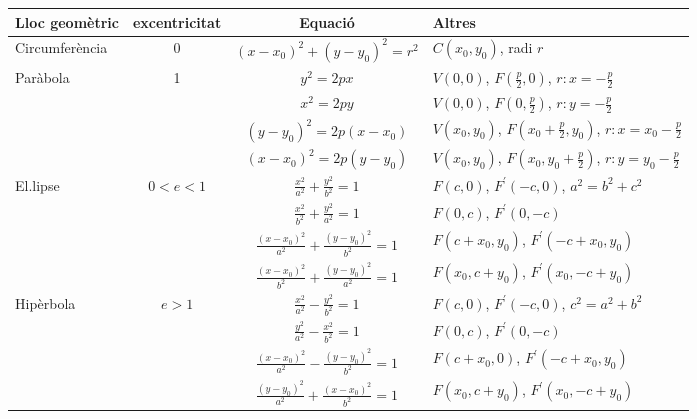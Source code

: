 \documentclass[a4paper,landscape]{article}
\begin{document}
	\author{Mireia Dosil}
	\date{text}


 
 
\begin{center}
	\begin{tabular}{ | l | c | c | l |}
		\hline
		Lloc geomètric & excentricitat & Equació & Altres \\ \hline
		Circumferència & 0 & $(x-x_0)^2+(y-y_0)^2=r^2$ & $C(x_0,y_0)$, radi $r$ \\
		\hline
		\multirow{4}{*}{Paràbola} & \multirow{4}{*}{1} & $y^2=2px$ & $V(0,0)$, $F(\frac{p}{2},0)$, $r:x=-\frac{p}{2}$ \\ \cline{3-4}
		& &  $x^2=2py$ & $V(0,0)$, $F(0,\frac{p}{2})$, $r:y=-\frac{p}{2}$  \\ \cline{3-4}
		& &  $(y-y_0)^2=2p(x-x_0)$ & $V(x_0,y_0)$, $F(x_0+\frac{p}{2},y_0)$, $r:x=x_0-\frac{p}{2}$  \\ \cline{3-4}
		& &  $(x-x_0)^2=2p(y-y_0)$ & $V(x_0,y_0)$, $F(x_0,y_0+\frac{p}{2})$, $r:y=y_0-\frac{p}{2}$  \\ \cline{3-4}
		\hline
		\multirow{4}{*}{El.lipse} & \multirow{4}{*}{$0<e<1$} & $\frac{x^2}{a^2}+\frac{y^2}{b^2}=1$ & $F(c,0)$, $F^\prime(-c,0)$, $a^2=b^2+c^2$  \\ \cline{3-4}
		& & $\frac{x^2}{b^2}+\frac{y^2}{a^2}=1$ & $F(0,c)$, $F^\prime(0,-c)$  \\ \cline{3-4}
		& & $\frac{(x-x_0)^2}{a^2}+\frac{(y-y_0)^2}{b^2}=1$ & $F(c+x_0,y_0)$, $F^\prime(-c+x_0,y_0)$\\ \cline{3-4}
		& & $\frac{(x-x_0)^2}{b^2}+\frac{(y-y_0)^2}{a^2}=1$ & $F(x_0,c+y_0)$, $F^\prime(x_0,-c+y_0)$  \\ \cline{3-4}
		\hline
		\multirow{4}{*}{Hipèrbola} & \multirow{4}{*}{$e>1$} & $\frac{x^2}{a^2}-\frac{y^2}{b^2}=1$ & $F(c,0)$, $F^\prime(-c,0)$, $c^2=a^2+b^2$  \\ \cline{3-4}
		& & $\frac{y^2}{a^2}-\frac{x^2}{b^2}=1$ & $F(0,c)$, $F^\prime(0,-c)$  \\ \cline{3-4}
		& & $\frac{(x-x_0)^2}{a^2}-\frac{(y-y_0)^2}{b^2}=1$ & $F(c+x_0,0)$, $F^\prime(-c+x_0,y_0)$\\ \cline{3-4}
		& & $\frac{(y-y_0)^2}{a^2}+\frac{(x-x_0)^2}{b^2}=1$ & $F(x_0,c+y_0)$, $F^\prime(x_0,-c+y_0)$  \\ \cline{3-4}
		\hline
	\end{tabular}
\end{center}
\end{document}
